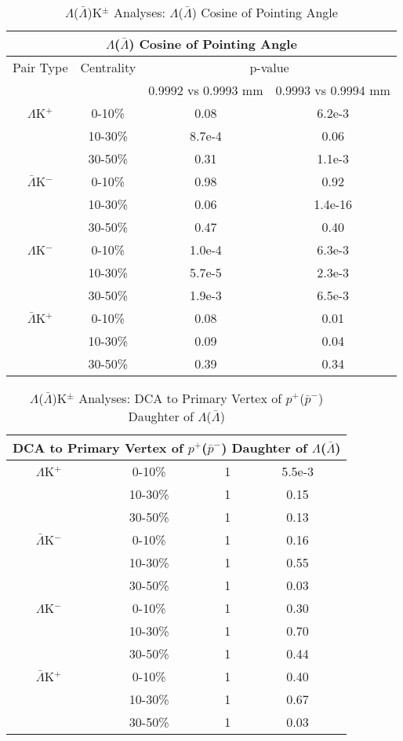 \documentclass[../AnalysisNoteJBuxton.tex]{subfiles}
\begin{document}
\begin{table}
 \centering
 \begin{tabular}{|c|c|c|c|}
 \multicolumn{4}{c}{$\Lambda$($\bar{\Lambda}$) Cosine of Pointing Angle} \\
  \hline
  Pair Type & Centrality & \multicolumn{2}{c|}{p-value} \\
  \cline{3-4}
   & & 0.9992 vs 0.9993 mm & 0.9993 vs 0.9994 mm \\
  \hline
  $\Lambda$K$^{+}$ & 0-10\% & 0.08 & 6.2e-3 \\
   & 10-30\% & 8.7e-4 & 0.06 \\
   & 30-50\% & 0.31 & 1.1e-3 \\
  \hline
  $\bar{\Lambda}$K$^{-}$ & 0-10\% & 0.98 & 0.92 \\
   & 10-30\% & 0.06 & 1.4e-16 \\
   & 30-50\% & 0.47 & 0.40 \\
  \hline \hline
  $\Lambda$K$^{-}$ & 0-10\% & 1.0e-4 & 6.3e-3 \\
   & 10-30\% & 5.7e-5 & 2.3e-3 \\
   & 30-50\% & 1.9e-3 & 6.5e-3 \\
  \hline
  $\bar{\Lambda}$K$^{+}$ & 0-10\% & 0.08 & 0.01 \\
   & 10-30\% & 0.09 & 0.04 \\
   & 30-50\% & 0.39 & 0.34 \\
  \hline
 \end{tabular}
 \caption{$\Lambda$($\bar{\Lambda}$)K$^{\pm}$ Analyses: $\Lambda$($\bar{\Lambda}$) Cosine of Pointing Angle}
 \label{tab:LamCosPointingAngleLamKch}
\end{table}

\begin{table}
 \centering
 \begin{tabular}{|c|c|c|c|}
 \multicolumn{4}{c}{DCA to Primary Vertex of $p^{+}$($\bar{p}^{-}$) Daughter of $\Lambda$($\bar{\Lambda}$)} \\
  \hline
  $\Lambda$K$^{+}$ & 0-10\% & 1 & 5.5e-3 \\
   & 10-30\% & 1 & 0.15 \\
   & 30-50\% & 1 & 0.13 \\
  \hline
  $\bar{\Lambda}$K$^{-}$ & 0-10\% & 1 & 0.16 \\
   & 10-30\% & 1 & 0.55 \\
   & 30-50\% & 1 & 0.03 \\
  \hline \hline
  $\Lambda$K$^{-}$ & 0-10\% & 1 & 0.30 \\
   & 10-30\% & 1 & 0.70 \\
   & 30-50\% & 1 & 0.44 \\
  \hline
  $\bar{\Lambda}$K$^{+}$ & 0-10\% & 1 & 0.40 \\
   & 10-30\% & 1 & 0.67 \\
   & 30-50\% & 1 & 0.03 \\
  \hline
 \end{tabular}
 \caption{$\Lambda$($\bar{\Lambda}$)K$^{\pm}$ Analyses: DCA to Primary Vertex of $p^{+}$($\bar{p}^{-}$) Daughter of $\Lambda$($\bar{\Lambda}$)}
 \label{tab:DcaToPrimVertexProtonDaughtOfLamLamKch}
\end{table}
\end{document}
